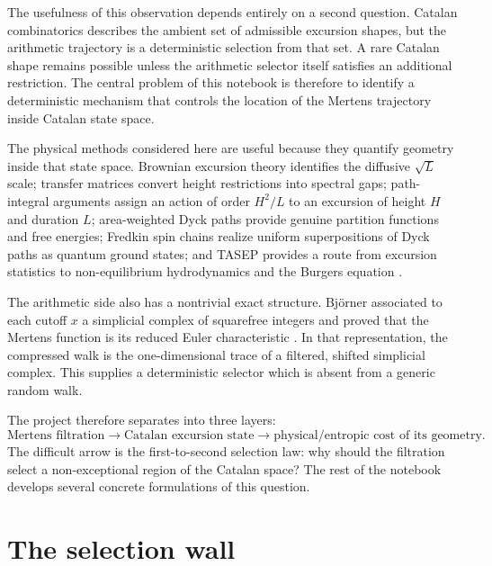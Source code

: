\documentclass[11pt]{amsart}
\numberwithin{equation}{section}
\theoremstyle{plain}
\theoremstyle{definition}
\theoremstyle{remark}
\begin{document}
The usefulness of this observation depends entirely on a second question.  Catalan combinatorics describes the ambient set of admissible excursion shapes, but the arithmetic trajectory is a deterministic selection from that set.  A rare Catalan shape remains possible unless the arithmetic selector itself satisfies an additional restriction.  The central problem of this notebook is therefore to identify a deterministic mechanism that controls the location of the Mertens trajectory inside Catalan state space.

The physical methods considered here are useful because they quantify geometry inside that state space.  Brownian excursion theory identifies the diffusive $\sqrt{L}$ scale; transfer matrices convert height restrictions into spectral gaps; path-integral arguments assign an action of order $H^2/L$ to an excursion of height $H$ and duration $L$; area-weighted Dyck paths provide genuine partition functions and free energies; Fredkin spin chains realize uniform superpositions of Dyck paths as quantum ground states; and TASEP provides a route from excursion statistics to non-equilibrium hydrodynamics and the Burgers equation \cite{Kaigh1976,DurrettIglehartMiller1977,KhorunzhiyMarckert2009,Kousha2012,OwczarekPrellberg2014,DerridaEnaudLebowitz2004,DellAnnaEtAl2016}.

The arithmetic side also has a nontrivial exact structure.  Bj\"orner associated to each cutoff $x$ a simplicial complex of squarefree integers and proved that the Mertens function is its reduced Euler characteristic \cite{Bjorner2011}.  In that representation, the compressed walk is the one-dimensional trace of a filtered, shifted simplicial complex.  This supplies a deterministic selector which is absent from a generic random walk.

The project therefore separates into three layers:
\begin{equation}
\text{Mertens filtration}
\longrightarrow
\text{Catalan excursion state}
\longrightarrow
\text{physical/entropic cost of its geometry}.
\label{eq:three_layer_program}
\end{equation}
The difficult arrow is the first-to-second selection law: why should the filtration select a non-exceptional region of the Catalan space?  The rest of the notebook develops several concrete formulations of this question.

\section{The selection wall}
\label{sec:selection_wall}
\end{document}
